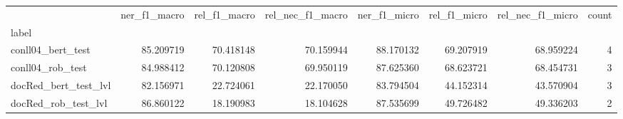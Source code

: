 \begin{tabular}{lrrrrrrr}
\toprule
{} &  ner\_f1\_macro &  rel\_f1\_macro &  rel\_nec\_f1\_macro &  ner\_f1\_micro &  rel\_f1\_micro &  rel\_nec\_f1\_micro &  count \\
label                &               &               &                   &               &               &                   &        \\
\midrule
conll04\_bert\_test    &     85.209719 &     70.418148 &         70.159944 &     88.170132 &     69.207919 &         68.959224 &      4 \\
conll04\_rob\_test     &     84.988412 &     70.120808 &         69.950119 &     87.625360 &     68.623721 &         68.454731 &      3 \\
docRed\_bert\_test\_lvl &     82.156971 &     22.724061 &         22.170050 &     83.794504 &     44.152314 &         43.570904 &      3 \\
docRed\_rob\_test\_lvl  &     86.860122 &     18.190983 &         18.104628 &     87.535699 &     49.726482 &         49.336203 &      2 \\
\bottomrule
\end{tabular}
